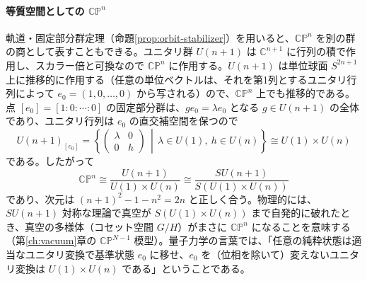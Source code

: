 \documentclass[uplatex, dvipdfmx, book]{jsbook}
\begin{document}
\paragraph{等質空間としての $\mathbb{CP}^n$}
軌道・固定部分群定理（命題\ref{prop:orbit-stabilizer}）を用いると、$\mathbb{CP}^n$ を別の群の商として表すこともできる。ユニタリ群 $U(n+1)$ は $\mathbb{C}^{n+1}$ に行列の積で作用し、スカラー倍と可換なので $\mathbb{CP}^n$ に作用する。$U(n+1)$ は単位球面 $S^{2n+1}$ 上に推移的に作用する（任意の単位ベクトルは、それを第1列とするユニタリ行列によって $e_0 = (1, 0, \dots, 0)$ から写される）ので、$\mathbb{CP}^n$ 上でも推移的である。点 $[e_0] = [1 : 0 : \cdots : 0]$ の固定部分群は、$g e_0 = \lambda e_0$ となる $g \in U(n+1)$ の全体であり、ユニタリ行列は $e_0$ の直交補空間を保つので
\begin{equation}
    U(n+1)_{[e_0]} = \left\{ \begin{pmatrix} \lambda & 0 \\ 0 & h \end{pmatrix} \,\middle|\, \lambda \in U(1),\ h \in U(n) \right\} \cong U(1) \times U(n)
\end{equation}
である。したがって
\begin{equation}
    \mathbb{CP}^n \cong \frac{U(n+1)}{U(1) \times U(n)} \cong \frac{SU(n+1)}{S(U(1) \times U(n))}
\end{equation}
であり、次元は $(n+1)^2 - 1 - n^2 = 2n$ と正しく合う。物理的には、$SU(n+1)$ 対称な理論で真空が $S(U(1) \times U(n))$ まで自発的に破れたとき、真空の多様体（コセット空間 $G/H$）がまさに $\mathbb{CP}^n$ になることを意味する（第\ref{ch:vacuum}章の $\mathbb{CP}^{N-1}$ 模型）。量子力学の言葉では、「任意の純粋状態は適当なユニタリ変換で基準状態 $e_0$ に移せ、$e_0$ を（位相を除いて）変えないユニタリ変換は $U(1) \times U(n)$ である」ということである。
\end{document}
